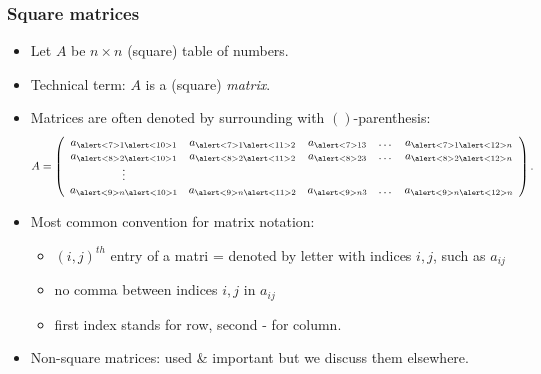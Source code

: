 \begin{frame}
\frametitle{Square matrices}
\begin{itemize}
\item Let $A$ be $n\times n$ (square) table of numbers.
\item<2-> Technical term: $A$ is a (square) \emph{matrix}. 
\item<3-> Matrices are often denoted by surrounding with $\left(\right)$-parenthesis:
\[
A=\left(
\begin{array}{ccccc}
a_{\alert<7>{1}\alert<10>{1}} & a_{\alert<7>{1}\alert<11>{2}} & a_{\alert<7>{1}3}& \dots & a_{\alert<7>{1}\alert<12>{n}}\\
a_{\alert<8>{2}\alert<10>{1}} & a_{\alert<8>{2}\alert<11>{2}} & a_{\alert<8>{2}3}& \dots & a_{\alert<8>{2}\alert<12>{n}}\\
\vdots \\
a_{\alert<9>{n}\alert<10>{1}} & a_{\alert<9>{n}\alert<11>{2}} & a_{\alert<9>{n}3}& \dots & a_{\alert<9>{n}\alert<12>{n}}
\end{array}
\right).
\] 

\item<4-> Most common convention for matrix notation: 
\begin{itemize}
\item $(i,j)^{th}$ entry of a matri = denoted by letter with indices $i,j$, such as $a_{ij}$
\item<5-> no comma between indices $i,j$ in $a_{ij}$
\item<6-> first index stands for row, second - for column. 
\end{itemize}
\item<13-> Non-square matrices: used \& important but we discuss them elsewhere.
\end{itemize}
\end{frame}



